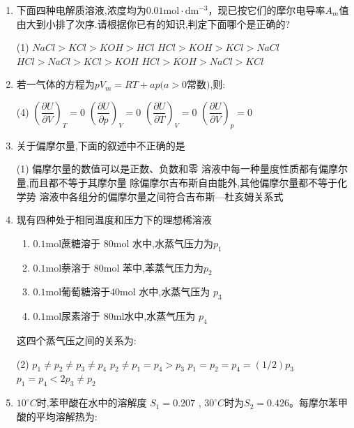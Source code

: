 \begin{enumerate}[label=\arabic*., itemsep=1.5ex]
    \item 下面四种电解质溶液,浓度均为$0.01\mathrm{mol\cdot dm^{-3}}$，现已按它们的摩尔电导率$A_m$值由大到小排了次序.请根据你已有的知识,判定下面哪个是正确的?
    \begin{tasks}(1)
        \task $NaCl > KCl > KOH > HCl$
        \task $HCl > KOH > KCl > NaCl$
        \task $HCl > NaCl > KCl > KOH$
        \task $HCl > KOH > NaCl > KCl$
    \end{tasks}
    \item 若一气体的方程为$pV_m=RT+ap(a>0$常数$)$,则:
    \begin{tasks}(4)
        \task $\left(\dfrac{\partial U}{\partial V}\right)_T=0$
        \task $\left(\dfrac{\partial U}{\partial p}\right)_V=0$
        \task $\left(\dfrac{\partial U}{\partial T}\right)_V=0$
        \task $\left(\dfrac{\partial U}{\partial V}\right)_p=0$
    \end{tasks}
    \item 关于偏摩尔量,下面的叙述中不正确的是
    \begin{tasks}(1)
        \task 偏摩尔量的数值可以是正数、负数和零
        \task 溶液中每一种量度性质都有偏摩尔量,而且都不等于其摩尔量
        \task 除偏摩尔吉布斯自由能外,其他偏摩尔量都不等于化学势
        \task 溶液中各组分的偏摩尔量之间符合吉布斯—杜亥姆关系式
    \end{tasks}
    \item 现有四种处于相同温度和压力下的理想稀溶液
    \begin{enumerate}[label=(\arabic*), noitemsep, topsep=0pt, partopsep=0pt]
        \item $0.1\mathrm{mol}$蔗糖溶于 $80\mathrm{mol}$ 水中,水蒸气压力为$p_1$
        \item $0.1\mathrm{mol}$萘溶于 $80\mathrm{mol}$ 苯中,苯蒸气压力为$p_2$
        \item $0.1\mathrm{mol}$葡萄糖溶于$40\mathrm{mol}$ 水中,水蒸气压为 $p_3$
        \item $0.1\mathrm{mol}$尿素溶于 $80\mathrm{ml}$水中,水蒸气压为 $p_4$
    \end{enumerate}
    这四个蒸气压之间的关系为:
    \begin{tasks}(2)
        \task $p_1\neq p_2\neq p_3\neq p_4$
        \task $p_2\neq p_1=p_4>p_3$
        \task $p_1=p_2=p_4=(1/2)p_3$
        \task $p_1=p_4<2p_3\neq p_2$
    \end{tasks}
    \item $10^\circ C$时,苯甲酸在水中的溶解度 $S_1=0.207$ , $30^\circ C$时为$S_2=0.426$。每摩尔苯甲酸的平均溶解热为:

\end{enumerate}
